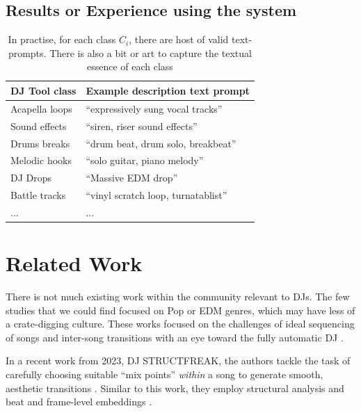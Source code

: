 \documentclass{article}
\begin{document}
\subsection{Results or Experience using the system}

\begin{table}
 \begin{center}
 \begin{tabular}{|l|l|}
  \hline
  DJ Tool class & Example description text prompt \\
  \hline
	Acapella loops & ``expressively sung vocal tracks''  \\
	Sound effects &  ``siren, riser sound effects''\\
	Drums breaks  & ``drum beat, drum solo, breakbeat''  \\
	Melodic hooks & ``solo guitar, piano melody''  \\
	DJ Drops & ``Massive EDM drop''  \\
	Battle tracks & ``vinyl scratch loop, turnatablist''   \\
	... & ... \\
  \hline
 \end{tabular}
\end{center}
 \caption{In practise, for each class $C_i$, there are host of valid text-prompts. There is also a bit or art to capture the textual essence of each class}
 \label{tab:example}
\end{table}


\section{Related Work}
There is not much existing work within the community relevant to DJs. The few studies that we could find focused on Pop or EDM genres, which may have less of a crate-digging culture. These works focused on the challenges of ideal sequencing of songs and inter-song transitions with an eye toward the fully automatic DJ \cite{kim2017automatic, huang2017djnet, bittner2017automatic}.

In a recent work from 2023, DJ STRUCTFREAK, the authors tackle the task of carefully choosing suitable ``mix points'' \textit{within} a song to generate smooth, aesthetic transitions \cite{kim2023dj}. Similar to this work, they employ structural analysis and beat and frame-level embeddings \cite{kim2023all}. 


\end{document}
